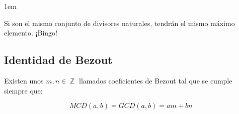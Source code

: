 \documentclass[12pt, fleqn]{report}                             %
\newenvironment{SmallIndentation}[1][0.75em]                    %
    {\begin{adjustwidth}{#1}{}\begin{footnotesize}}                 %
    {\end{footnotesize}\end{adjustwidth}}                           %
\DeclareMathOperator \Integers  {\mathbb{Z}}                     %
\begin{document}
\begin{itemize}
\begin{SmallIndentation}[1em]
                        Si son el mismo conjunto de divisores naturales, tendrán el mismo máximo elemento.
                        ¡Bingo!

                        

                    \end{SmallIndentation} 

            \end{itemize}




        \clearpage
        \subsection{Identidad de Bezout}

            Existen unos $m, n \in \Integers$ llamados coeficientes de Bezout tal que se
            cumple siempre que:

            \begin{equation}
                MCD(a,b) = GCD(a,b) = am+bn
            \end{equation}
\end{document}
